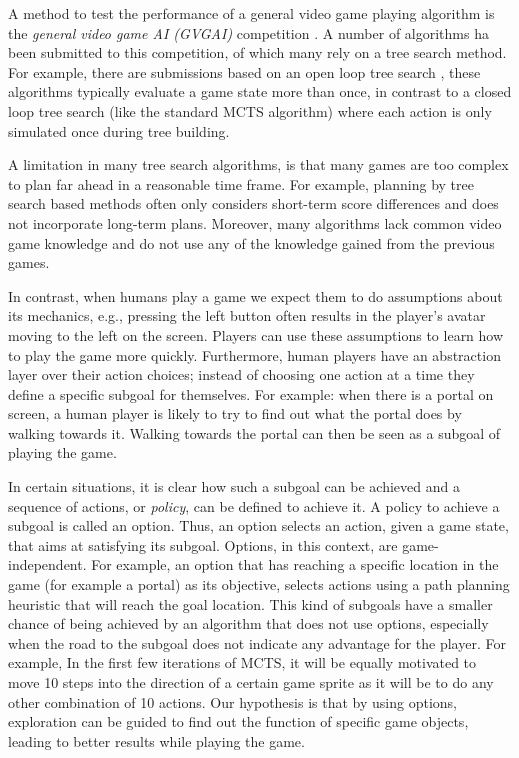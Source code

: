 
A method to test the performance of a general video game playing algorithm is
the \emph{general video game AI (GVGAI)} competition \cite{perez2014}.  A number
of algorithms ha been submitted to this competition, of which many rely on a tree
search method. For example, there are submissions based on an open loop tree
search \cite{perez2015open}, these algorithms typically evaluate a game state
more than once, in contrast to a closed loop tree search (like the standard MCTS
algorithm) where each action is only simulated once during tree building. 

A limitation in many tree search algorithms, is that many games are too complex
to plan far ahead in a reasonable time frame. For example, planning by tree
search based methods often only considers short-term score differences and does
not incorporate long-term plans. Moreover, many algorithms lack common video
game knowledge and do not use any of the knowledge gained from the previous
games.

In contrast, when humans play a game we expect them to do assumptions about
its mechanics, e.g., pressing the left button often results in the player's
avatar moving to the left on the screen. Players can use these assumptions to
learn how to play the game more quickly. Furthermore, human players have an
abstraction layer over their action choices; instead of choosing one action at a
time they define a specific subgoal for themselves.  For example: when there is
a portal on screen, a human player is likely to try to find out what the portal
does by walking towards it. Walking towards the portal can then be seen as a
subgoal of playing the game. 

In certain situations, it is clear how such a subgoal can be achieved and a
sequence of actions, or \emph{policy}, can be defined to achieve it. A policy to
achieve a subgoal is called an option. Thus, an option selects an action, given
a game state, that aims at satisfying its subgoal. Options, in this context, are
game-independent. For example, an option that has reaching a specific location
in the game (for example a portal) as its objective, selects actions using a
path planning heuristic that will reach the goal location. This kind of subgoals
have a smaller chance of being achieved by an algorithm that does not use
options, especially when the road to the subgoal does not indicate any advantage
for the player. For example, In the first few iterations of MCTS, it will be
equally motivated to move 10 steps into the direction of a certain game sprite
as it will be to do any other combination of 10 actions. Our hypothesis is that
by using options, exploration can be guided to find out the function of
specific game objects, leading to better results while playing the game.

